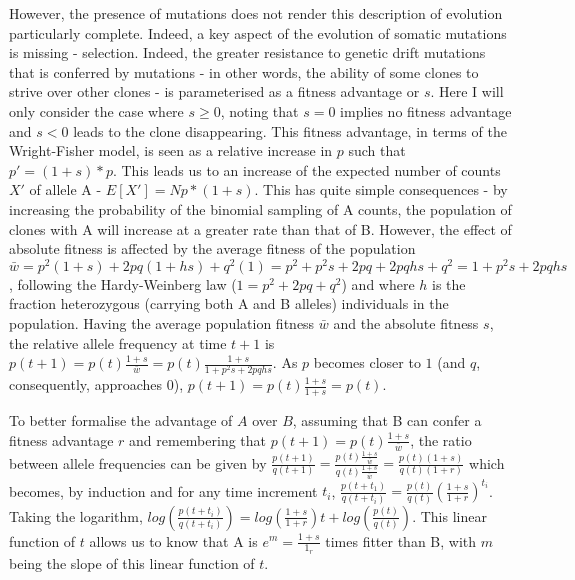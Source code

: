 However, the presence of mutations does not render this description of evolution particularly complete. Indeed, a key aspect of the evolution of somatic mutations is missing - selection. Indeed, the greater resistance to genetic drift mutations that is conferred by mutations - in other words, the ability of some clones to strive over other clones - is parameterised as a fitness advantage or $s$. Here I will only consider the case where $s \geq 0$, noting that $s = 0$ implies no fitness advantage and $s < 0$ leads to the clone disappearing. This fitness advantage, in terms of the Wright-Fisher model, is seen as a relative increase in $p$ such that $p' = (1+s)*p$. This leads us to an increase of the expected number of counts $X'$ of allele A - $E[X'] = Np*(1+s)$. This has quite simple consequences - by increasing the probability of the binomial sampling of A counts, the population of clones with A will increase at a greater rate than that of B. However, the effect of absolute fitness is affected by the average fitness of the population $\bar{w} = p^2(1+s) + 2pq(1+hs) + q^2(1) = p^2 + p^2s + 2pq + 2pqhs + q^2 = 1 + p^2s + 2pqhs$, following the Hardy-Weinberg law ($1 = p^2 + 2pq + q^2$) and where $h$ is the fraction heterozygous (carrying both A and B alleles) individuals in the population. Having the average population fitness $\bar{w}$ and the absolute fitness $s$, the relative allele frequency at time $t+1$ is $p(t+1) = p(t)\frac{1+s}{\bar{w}} = p(t)\frac{1+s}{1 + p^2s + 2pqhs}$. As $p$ becomes closer to $1$ (and $q$, consequently, approaches $0$), $p(t+1) = p(t)\frac{1+s}{1+s} = p(t)$. 

To better formalise the advantage of $A$ over $B$, assuming that B can confer a fitness advantage $r$ and remembering that $p(t+1) = p(t)\frac{1+s}{\bar{w}}$, the ratio between allele frequencies can be given by $\frac{p(t+1)}{q(t+1)} = \frac{p(t)\frac{1+s}{\bar{w}}}{q(t)\frac{1+s}{\bar{w}}} = \frac{p(t)(1+s)}{q(t)(1+r)}$ which becomes, by induction and for any time increment $t_i$, $\frac{p(t+t_1)}{q(t+t_i)}=\frac{p(t)}{q(t)}(\frac{1+s}{1+r})^{t_i}$. Taking the logarithm, $log(\frac{p(t+t_i)}{q(t+t_i)}) = log(\frac{1+s}{1+r})t + log(\frac{p(t)}{q(t)})$. This linear function of $t$ allows us to know that A is $e^{m} = \frac{1+s}{1_r}$ times fitter than B, with $m$ being the slope of this linear function of $t$. 


